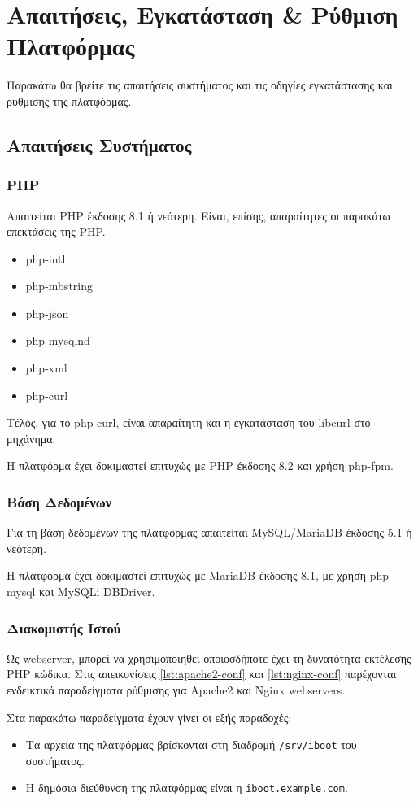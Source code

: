 \chapter{Απαιτήσεις, Εγκατάσταση \& Ρύθμιση Πλατφόρμας}
Παρακάτω θα βρείτε τις απαιτήσεις συστήματος και τις οδηγίες εγκατάστασης και ρύθμισης της πλατφόρμας.

\section{Απαιτήσεις Συστήματος}

\subsection{PHP}
Απαιτείται PHP έκδοσης 8.1 ή νεότερη.
Είναι, επίσης, απαραίτητες οι παρακάτω επεκτάσεις της PHP.

\begin{itemize}
	\item php-intl
	\item php-mbstring
	\item php-json
	\item php-mysqlnd
	\item php-xml
	\item php-curl
\end{itemize}

Τέλος, για το php-curl, είναι απαραίτητη και η εγκατάσταση του libcurl στο μηχάνημα.

Η πλατφόρμα έχει δοκιμαστεί επιτυχώς με PHP έκδοσης 8.2 και χρήση php-fpm.

\subsection{Βάση Δεδομένων}
Για τη βάση δεδομένων της πλατφόρμας απαιτείται MySQL/MariaDB έκδοσης 5.1 ή νεότερη.

Η πλατφόρμα έχει δοκιμαστεί επιτυχώς με MariaDB έκδοσης 8.1, με χρήση php-mysql και MySQLi DBDriver.

\subsection{Διακομιστής Ιστού}
Ως webserver, μπορεί να χρησιμοποιηθεί οποιοσδήποτε έχει τη δυνατότητα εκτέλεσης PHP κώδικα. Στις απεικονίσεις \ref{lst:apache2-conf} και \ref{lst:nginx-conf} παρέχονται ενδεικτικά παραδείγματα ρύθμισης για Apache2 και Nginx webservers.

Στα παρακάτω παραδείγματα έχουν γίνει οι εξής παραδοχές:
\begin{itemize}
	\item Τα αρχεία της πλατφόρμας βρίσκονται στη διαδρομή \verb!/srv/iboot! του συστήματος.
	\item Η δημόσια διεύθυνση της πλατφόρμας είναι η \verb!iboot.example.com!.
\end{itemize}

